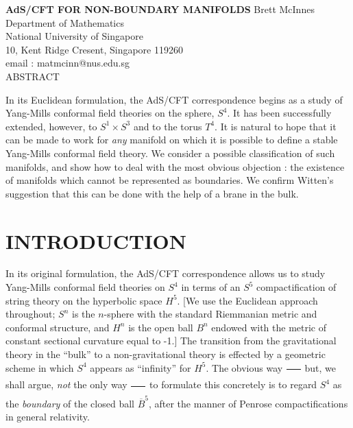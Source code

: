 \documentclass[a4paper,12pt]{article}
\theoremstyle{definition}
\renewcommand{\u}{\textit}
\renewcommand{\-}{$\dfrac{\quad\enspace}{\quad}$}
\begin{document}
\begin{titlepage}
\setlength{\baselineskip}{16pt}
\begin{center}
\vskip 1in
{\large \textbf{AdS/CFT FOR NON-BOUNDARY MANIFOLDS}}
\vskip 1in
Brett McInnes
\break
Department of Mathematics\\
National University of Singapore\\
10, Kent Ridge Cresent, Singapore 119260\\
email : matmcinn@nus.edu.sg\\
\vskip 1in
ABSTRACT
\end{center}

In its Euclidean formulation, the AdS/CFT correspondence begins as a study of Yang-Mills conformal field theories on the sphere, $S^4$. It has been successfully extended, however, to $S^1\times S^3$ and to the torus $T^4$. It is natural to hope that it can be made to work for \u{any} manifold on which it is possible to define a stable Yang-Mills conformal field theory. We consider a possible classification of such manifolds, and show how to deal with the most obvious objection : the existence of manifolds which cannot be represented as boundaries. We confirm Witten's suggestion that this can be done with the help of a brane in the bulk.




\end{titlepage}
\setlength{\baselineskip}{20pt}

\renewcommand{\thesection}{\Roman{section}}
\section{\large INTRODUCTION}
In its original formulation, the AdS/CFT correspondence \cite{1} allows us to study Yang-Mills conformal field theories on $S^4$ in terms of an $S^5$ compactification of string theory on the hyperbolic space $H^5$. [We use the Euclidean approach throughout; $S^n$ is the $n$-sphere with the standard Riemmanian metric and conformal structure, and $H^n$ is the open ball $B^n$ endowed with the metric of constant sectional curvature equal to -1.] The transition from the gravitational theory in the ``bulk'' to a non-gravitational theory is effected by a geometric scheme in which $S^4$ appears as ``infinity'' for $H^5$. The obvious way \- but, we shall argue, \u{not} the only way \- to formulate this concretely is to regard $S^4$ as the \u{boundary} of the closed ball $\overline{B}^5$, after the manner of Penrose compactifications \cite{2} in general relativity.
\end{document}
